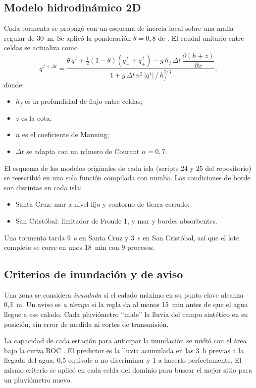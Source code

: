 \documentclass{sosg-informe}
\begin{document}
\subsection{Modelo hidrodinámico 2D}
Cada tormenta se propagó con un esquema de inercia local \citep[LISFLOOD-FP \enquote{acc};][]{bates2010} sobre una malla regular de 30~m. Se aplicó la ponderación $\theta = 0,8$ de \citet{dealmeida2012}. El caudal unitario entre celdas se actualiza como
\begin{equation}
  q^{\,t+\Delta t} = \frac{\theta\, q^{\,t} + \tfrac{1}{2}(1-\theta)\left(q^{\,t}_{-} + q^{\,t}_{+}\right) - g\, h_f\, \Delta t\, \dfrac{\partial (h+z)}{\partial x}}{1 + g\, \Delta t\, n^2\, \lvert q^{\,t}\rvert \,/\, h_f^{7/3}},
\end{equation}
donde:
\begin{itemize}
  \item $h_f$ es la profundidad de flujo entre celdas;
  \item $z$ es la cota;
  \item $n$ es el coeficiente de Manning;
  \item $\Delta t$ se adapta con un número de Courant $\alpha = 0,7$.
\end{itemize}

El esquema de los modelos originales de cada isla (scripts 24 y 25 del repositorio) se reescribió en una sola función compilada con numba. Las condiciones de borde son distintas en cada isla:
\begin{itemize}
  \item Santa Cruz: mar a nivel fijo y contorno de tierra cerrado;
  \item San Cristóbal: limitador de Froude 1, y mar y bordes absorbentes.
\end{itemize}
Una tormenta tarda 9~s en Santa Cruz y 3~s en San Cristóbal, así que el lote completo se corre en unos 18~min con 9 procesos.

\subsection{Criterios de inundación y de aviso}\label{sec:criterios}
Una zona se considera \emph{inundada} si el calado máximo en su punto clave alcanza 0,3~m. Un aviso es \emph{a tiempo} si la regla da \alto{} al menos 15~min antes de que el agua llegue a ese calado. Cada pluviómetro \enquote{mide} la lluvia del campo sintético en su posición, sin error de medida ni cortes de transmisión.

La capacidad de cada estación para anticipar la inundación se midió con el área bajo la curva ROC \citep[AUC;][]{fawcett2006}. El predictor es la lluvia acumulada en las 3~h previas a la llegada del agua: 0,5 equivale a no discriminar y 1 a hacerlo perfectamente. El mismo criterio se aplicó en cada celda del dominio para buscar el mejor sitio para un pluviómetro nuevo.
\end{document}
